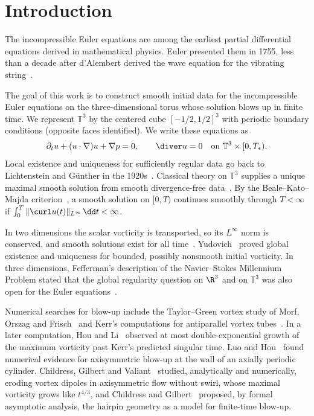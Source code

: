 \section{Introduction}\label{cc:sec:problem}

The incompressible Euler equations are among the earliest partial
differential equations derived in mathematical physics. Euler presented them in
1755, less than a decade after d'Alembert derived the wave equation for
the vibrating string~\cite{DAlembert1747,Euler1757}.

The goal of this work is to construct smooth initial data for the
incompressible Euler equations on the three-dimensional torus whose
solution blows up in finite time. We represent $\mathbb T^3$ by the
centered cube $[-1/2,1/2]^3$ with periodic boundary conditions
(opposite faces identified). We write these equations as
\begin{equation}\label{cc:eq:euler}
 \partial_tu+(u\cdot\nabla)u+\nabla p=0,
 \qquad \diver u=0
 \quad\hbox{on }\mathbb T^3\times[0,T_*).
\end{equation}
Local existence and uniqueness for sufficiently regular data go back to
Lichtenstein and G\"unther in the 1920s~\cite{Lichtenstein1925,Gunther1926}.
Classical theory on $\mathbb T^3$ supplies a unique maximal smooth solution
from smooth divergence-free data~\cite{EbinMarsden,BedrossianVicol}.
By the Beale--Kato--Majda criterion~\cite{BKM,GGPP}, a smooth solution on
$[0,T)$ continues smoothly through $T<\infty$ if
$\int_0^T\|\curl u(t)\|_{L^\infty}\,\dd t<\infty$.

In two dimensions the scalar vorticity is transported, so its
$L^\infty$ norm is conserved, and smooth solutions exist for all
time~\cite{Wolibner1933}. Yudovich~\cite{Yudovich1963} proved global
existence and uniqueness for bounded, possibly nonsmooth initial
vorticity. In three dimensions, Fefferman's description of the
Navier--Stokes Millennium Problem stated that the global regularity
question on $\R^3$ and on $\mathbb T^3$ was also open for the Euler
equations~\cite{Fefferman2006}.

Numerical searches for blow-up include the Taylor--Green vortex study
of Morf, Orszag and Frisch~\cite{MorfOrszagFrisch1980} and Kerr's
computations for antiparallel vortex tubes~\cite{Kerr1993}.
In a later computation, Hou and Li~\cite{HouLi2006} observed at most
double-exponential growth of the maximum vorticity past Kerr's predicted
singular time.
Luo and Hou~\cite{LuoHou2014} found numerical evidence for axisymmetric
blow-up at the wall of an axially periodic cylinder.
Childress, Gilbert and Valiant~\cite{ChildressGilbertValiant2016}
studied, analytically and numerically, eroding vortex dipoles in
axisymmetric flow without swirl, whose maximal vorticity grows like
$t^{4/3}$, and Childress and Gilbert~\cite{ChildressGilbert2018}
proposed, by formal asymptotic analysis, the hairpin geometry as a model
for finite-time blow-up.

